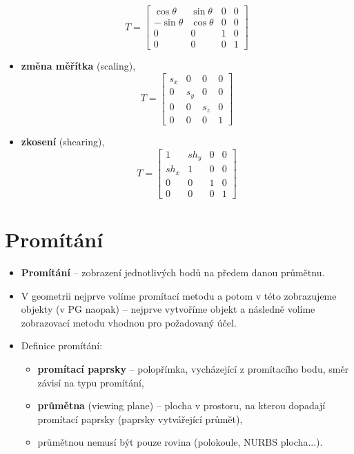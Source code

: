 \begin{itemize}
\begin{equation*}
              T = 	\begin{bmatrix}
                  \cos{\theta}  & \sin{\theta} & 0 & 0 \\[0.3em]
                  -\sin{\theta} & \cos{\theta} & 0 & 0 \\[0.3em]
                  0             & 0            & 1 & 0 \\[0.3em]
                  0             & 0            & 0 & 1
              \end{bmatrix}
          \end{equation*}
    \item \textbf{změna měřítka} (scaling),
          \begin{equation*}
              T = 	\begin{bmatrix}
                  s_x & 0   & 0   & 0 \\[0.3em]
                  0   & s_y & 0   & 0 \\[0.3em]
                  0   & 0   & s_z & 0 \\[0.3em]
                  0   & 0   & 0   & 1
              \end{bmatrix}
          \end{equation*}
    \item \textbf{zkosení} (shearing),
          \begin{equation*}
              T = 	\begin{bmatrix}
                  1    & sh_y & 0 & 0 \\[0.3em]
                  sh_x & 1    & 0 & 0 \\[0.3em]
                  0    & 0    & 1 & 0 \\[0.3em]
                  0    & 0    & 0 & 1
              \end{bmatrix}
          \end{equation*}
\end{itemize}

\section{Promítání}
\begin{itemize}
    \item \textbf{Promítání} -- zobrazení jednotlivých bodů na předem danou průmětnu.
    \item V geometrii nejprve volíme promítací metodu a potom v této zobrazujeme objekty (v PG naopak) -- nejprve vytvoříme objekt a následně volíme zobrazovací metodu vhodnou pro požadovaný účel.
    \item Definice promítání:
          \begin{itemize}
              \item \textbf{promítací paprsky} -- polopřímka, vycházející z promítacího bodu, směr závisí na typu promítání,
              \item \textbf{průmětna} (viewing plane) -- plocha v prostoru, na kterou dopadají promítací paprsky (paprsky vytvářející průmět),
              \item průmětnou nemusí být pouze rovina (polokoule, NURBS plocha...).
          \end{itemize}
\end{itemize}

